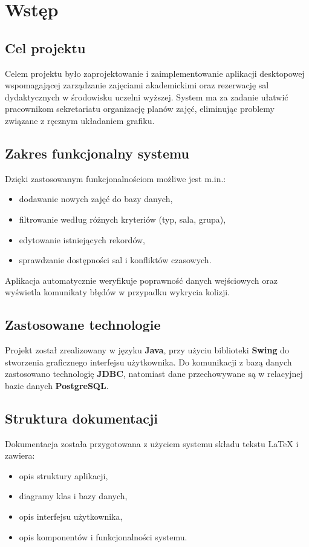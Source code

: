 \section{Wstęp}

\subsection{Cel projektu}

Celem projektu było zaprojektowanie i zaimplementowanie aplikacji desktopowej wspomagającej zarządzanie zajęciami akademickimi oraz rezerwację sal dydaktycznych w środowisku uczelni wyższej.  
System ma za zadanie ułatwić pracownikom sekretariatu organizację planów zajęć, eliminując problemy związane z ręcznym układaniem grafiku.

\subsection{Zakres funkcjonalny systemu}

Dzięki zastosowanym funkcjonalnościom możliwe jest m.in.:
\begin{itemize}
    \item dodawanie nowych zajęć do bazy danych,
    \item filtrowanie według różnych kryteriów (typ, sala, grupa),
    \item edytowanie istniejących rekordów,
    \item sprawdzanie dostępności sal i konfliktów czasowych.
\end{itemize}

Aplikacja automatycznie weryfikuje poprawność danych wejściowych oraz wyświetla komunikaty błędów w przypadku wykrycia kolizji.

\subsection{Zastosowane technologie}

Projekt został zrealizowany w języku \textbf{Java}, przy użyciu biblioteki \textbf{Swing} do stworzenia graficznego interfejsu użytkownika.  
Do komunikacji z bazą danych zastosowano technologię \textbf{JDBC}, natomiast dane przechowywane są w relacyjnej bazie danych \textbf{PostgreSQL}.

\subsection{Struktura dokumentacji}

Dokumentacja została przygotowana z użyciem systemu składu tekstu \LaTeX{} i zawiera:
\begin{itemize}
    \item opis struktury aplikacji,
    \item diagramy klas i bazy danych,
    \item opis interfejsu użytkownika,
    \item opis komponentów i funkcjonalności systemu.
\end{itemize}
